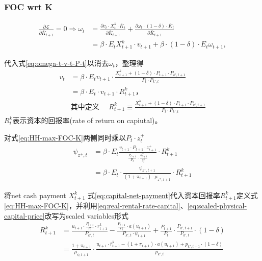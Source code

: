 \subsubsection{FOC wrt K}
\label{sec:FOC-wrt-K}
\begin{equation}
\label{eq:HH-max-FOC-K-intm}
\begin{split}
\frac{\partial \mathcal{L}}{\partial \bar{K}_{t+1}} = 0 \Rightarrow \omega_t &=\frac{
  \partial v_t \cdot X^k_t \cdot \bar{K}_t
}{\partial \bar{K}_{t+1}} +
\frac{
  \partial \omega_t \cdot \left(1-\delta \right) \cdot \bar{K}_t
}{\partial \bar{K}_{t+1}} \\
&=\beta \cdot E_t X^k_{t+1} \cdot v_{t+1} + \beta \cdot (1-\delta) \cdot E_t \omega_{t+1},
\end{split}
\end{equation}


代入式\eqref{eq:omega-t-v-t-P-t}以消去$\omega_t$，整理得
\begin{equation}
\label{eq:HH-max-FOC-K}
\begin{split}
v_t  &= \beta \cdot E_t v_{t+1} \cdot \frac{
  X^k_{t+1} + (1-\delta) \cdot P_{t+1} \cdot P_{k',t+1}
}{P_t \cdot P_{k',t}} \\
&= \beta \cdot E_t \cdot v_{t+1} \cdot R^k_{t+1}， \\
&\text{其中定义 } \quad R^k_{t+1} \equiv \frac{
  X^k_{t+1} + (1-\delta) \cdot P_{t+1} \cdot P_{k',t+1}
}{P_t \cdot P_{k',t}}
\end{split}
\end{equation}
$R^k_t$表示资本的回报率(rate of return on capiutal)。

对式\eqref{eq:HH-max-FOC-K}两侧同时乘以$P_t \cdot z^+_t$
\begin{equation}
\label{eq:HH-max-FOC-K-scaled}
\begin{split}
\psi_{z^+,t} &= \beta \cdot E_t \frac{
  v_{t+1} \cdot P_{t+1} \cdot z^+_{t+1}
}{
  \frac{P_{t+1}}{P_t} \cdot \frac{z^+_{t+1}}{z^+_{t}}
} \cdot R^k_{t+1}\\
&=
\beta \cdot E_t \cdot \frac{
  \psi_{z^+, t+1}
}{\left( 1+\pi_{t+1} \right) \cdot \mu_{z^+,t+1}} \cdot R^k_{t+1}
\end{split}
\end{equation}

将net cash payment $X^k_{t+1}$ 式\eqref{eq:capital-net-payment}代入资本回报率$R^k_{t+1}$定义式\eqref{eq:HH-max-FOC-K}，并利用\eqref{eq:real-rental-rate-capital}、\eqref{eq:scaled-physical-capital-price}改写为scaled variables形式
\begin{equation}
\label{eq:HH-max-FOC-K-R-scaled}
\begin{split}
R^k_{t+1} &=
\frac{
  u_{t+1} \cdot \frac{P_{t+1}}{P_t} \cdot r^k_{t+1}
}{P_{k',t}} -
\frac{
  \frac{P_{t+1}}{P_t} \cdot a(u_{t+1})
}{P_{k',t} \cdot \psi_{t+1}} + \frac{P_{t+1}}{P_t} \cdot \frac{P_{k',t+1}}{P_{k',t}} \cdot (1-\delta) \\
&= \frac{1+\pi_{t+1}}{\mu_{\psi,t+1}} \cdot \frac{
  u_{t+1} \cdot \bar{r}^k_{t+1} - \left( 1+\pi_{t+1} \right) \cdot a(u_{t+1}) + p_{k',t+1} \cdot (1-\delta)
  }{p_{k',t}}
\end{split}
\end{equation}

